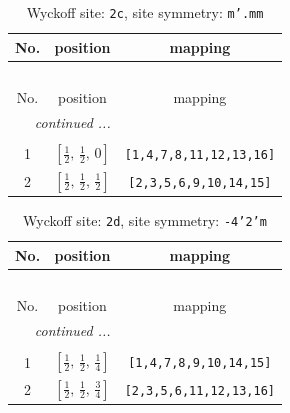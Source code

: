 \documentclass[fleqn,8pt]{jsarticle}
\begin{document}
\renewcommand{\arraystretch}{1.2}
\begin{longtable}{ccc}
\caption{Wyckoff site: {\tt 2c}, site symmetry: {\tt m'.mm}}
 \\
 \hline \hline
No. & position & mapping \\ \hline \endfirsthead

\multicolumn{2}{l}{\tablename\ \thetable{}} \\
 \hline \hline
No. & position & mapping \\ \hline \endhead

 \hline \hline
\multicolumn{2}{r}{\footnotesize\it continued ...} \\ \endfoot

 \hline \hline
\multicolumn{2}{r}{} \\ \endlastfoot

1 & $\left[ \frac{1}{2},\, \frac{1}{2},\, 0 \right]$ & {\tt [1,4,7,8,11,12,13,16]} \\ \hline
2 & $\left[ \frac{1}{2},\, \frac{1}{2},\, \frac{1}{2} \right]$ & {\tt [2,3,5,6,9,10,14,15]} \\
\end{longtable}
\renewcommand{\arraystretch}{1.2}
\begin{longtable}{ccc}
\caption{Wyckoff site: {\tt 2d}, site symmetry: {\tt -4'2'm}}
 \\
 \hline \hline
No. & position & mapping \\ \hline \endfirsthead

\multicolumn{2}{l}{\tablename\ \thetable{}} \\
 \hline \hline
No. & position & mapping \\ \hline \endhead

 \hline \hline
\multicolumn{2}{r}{\footnotesize\it continued ...} \\ \endfoot

 \hline \hline
\multicolumn{2}{r}{} \\ \endlastfoot

1 & $\left[ \frac{1}{2},\, \frac{1}{2},\, \frac{1}{4} \right]$ & {\tt [1,4,7,8,9,10,14,15]} \\ \hline
2 & $\left[ \frac{1}{2},\, \frac{1}{2},\, \frac{3}{4} \right]$ & {\tt [2,3,5,6,11,12,13,16]} \\
\end{longtable}
\renewcommand{\arraystretch}{1.2}
\end{document}
